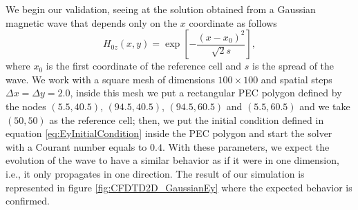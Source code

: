 \documentclass[12pt, oneside]{book}
\begin{document}
We begin our validation, seeing at the solution obtained from a Gaussian magnetic wave that depends only on the $x$ coordinate as follows
\begin{equation}
    H_{0z}(x,y) = \exp \left[ - \dfrac{(x - x_0)^2}{\sqrt{2} s} \right],
\label{eq:EyInitialCondition}
\end{equation}
where $x_0$ is the first coordinate of the reference cell and $s$ is the spread of the wave. We work with a square mesh of dimensions $100 \times 100$ and spatial steps $\Delta x = \Delta y = 2.0$, inside this mesh we put a rectangular PEC polygon defined by the nodes $(5.5,40.5)$, $(94.5,40.5)$, $(94.5, 60.5)$ and $(5.5, 60.5)$ and we take $(50, 50)$ as the reference cell; then, we put the initial condition defined in equation \ref{eq:EyInitialCondition} inside the PEC polygon and start the solver with a Courant number equals to $0.4$. With these parameters, we expect the evolution of the wave to have a similar behavior as if it were in one dimension, i.e., it only propagates in one direction. The result of our simulation is represented in figure \ref{fig:CFDTD2D_GaussianEy} where the expected behavior is confirmed.
\end{document}
